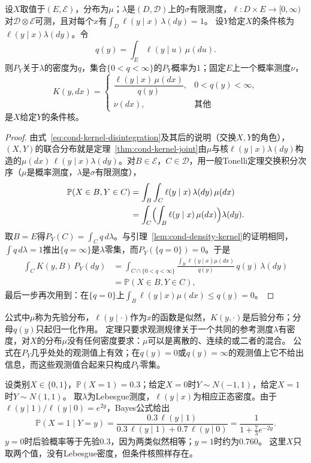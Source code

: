 \begin{theorem}[Bayes公式]
\label{thm:cond-bayes}
设$X$取值于$(E,\mathcal E)$，分布为$\mu$；$\lambda$是$(D,\mathcal D)$上的$\sigma$有限测度，$\ell:D\times E\to[0,\infty)$对$\mathcal D\otimes\mathcal E$可测，且对每个$x$有$\int_D\ell(y\mid x)\,\lambda(dy)=1$。
设$Y$给定$X$的条件核为$\ell(y\mid x)\lambda(dy)$。令
\[
  q(y)=\int_E\ell(y\mid u)\,\mu(du).
\]
则$P_Y$关于$\lambda$的密度为$q$，集合$\{0<q<\infty\}$的$P_Y$概率为$1$；固定$E$上一个概率测度$\nu$，
\[
  K(y,dx)=
  \begin{cases}
    \dfrac{\ell(y\mid x)\,\mu(dx)}{q(y)}, & 0<q(y)<\infty,\\[1ex]
    \nu(dx), & \text{其他}
  \end{cases}
\]
是$X$给定$Y$的条件核。
\end{theorem}

\begin{proof}
由式~\eqref{eq:cond-kernel-disintegration}及其后的说明（交换$X,Y$的角色），$(X,Y)$的联合分布就是定理~\ref{thm:cond-kernel-joint}由$\mu$与核$\ell(y\mid x)\lambda(dy)$构造的$\mu(dx)\,\ell(y\mid x)\lambda(dy)$。对$B\in\mathcal E$，$C\in\mathcal D$，用一般Tonelli定理交换积分次序（$\mu$是概率测度，$\lambda$是$\sigma$有限测度），
\[
  \begin{aligned}
  \mathbb P(X\in B,Y\in C)&=\int_B\int_C\ell(y\mid x)\,\lambda(dy)\,\mu(dx)\\
  &=\int_C\Bigl(\int_B\ell(y\mid x)\,\mu(dx)\Bigr)\lambda(dy).
  \end{aligned}
\]
取$B=E$得$P_Y(C)=\int_Cq\,d\lambda$。与引理~\ref{lem:cond-density-kernel}的证明相同，$\int q\,d\lambda=1$推出$\{q=\infty\}$是$\lambda$零集，而$P_Y(\{q=0\})=0$。于是
\[
  \begin{aligned}
  \int_CK(y,B)\,P_Y(dy)&=\int_{C\cap\{0<q<\infty\}}\frac{\int_B\ell(y\mid x)\mu(dx)}{q(y)}\,q(y)\,\lambda(dy)\\
  &=\mathbb P(X\in B,Y\in C),
  \end{aligned}
\]
最后一步再次用到：在$\{q=0\}$上$\int_B\ell(y\mid x)\mu(dx)\leq q(y)=0$。
\end{proof}

公式中$\mu$称为先验分布，$\ell(y\mid\cdot)$作为$x$的函数是似然，$K(y,\cdot)$是后验分布；分母$q(y)$只起归一化作用。
定理只要求观测规律关于一个共同的参考测度$\lambda$有密度，对$X$的分布$\mu$没有任何密度要求：$\mu$可以是离散的、连续的或二者的混合。
公式在$P_Y$几乎处处的观测值上有效；在$q(y)=0$或$q(y)=\infty$的观测值上它不给出信息，而这些观测值合起来只构成$P_Y$零集。

\begin{example}[离散类别与连续观测]
\label{ex:cond-bayes-classes}
设类别$X\in\{0,1\}$，$\mathbb P(X=1)=0.3$；给定$X=0$时$Y\sim N(-1,1)$，给定$X=1$时$Y\sim N(1,1)$。
取$\lambda$为Lebesgue测度，$\ell(y\mid x)$为相应正态密度。由于$\ell(y\mid1)/\ell(y\mid0)=e^{2y}$，Bayes公式给出
\[
  \mathbb P(X=1\mid Y=y)=\frac{0.3\,\ell(y\mid1)}{0.3\,\ell(y\mid1)+0.7\,\ell(y\mid0)}=\frac{1}{1+\frac{7}{3}e^{-2y}}.
\]
$y=0$时后验概率等于先验$0.3$，因为两类似然相等；$y=1$时约为$0.760$。
这里$X$只取两个值，没有Lebesgue密度，但条件核照样存在。
\end{example}


